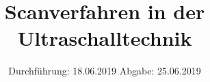 

\subject{US2}
\title{Scanverfahren in der Ultraschalltechnik}
\date{
  Durchführung: 18.06.2019
  \hspace{3em}
  Abgabe: 25.06.2019
}


\maketitle
\thispagestyle{empty}
\tableofcontents
\newpage

%

%




\nocite{*}
\printbibliography

